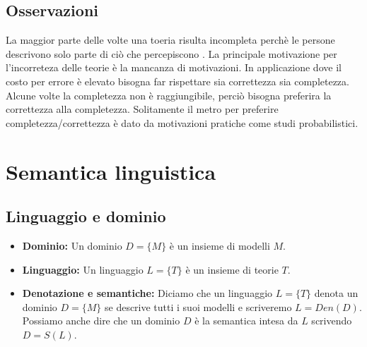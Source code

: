 \documentclass[../main.tex]{subfiles}
\newcommand{\spazio}{\vspace{1em} \newline}
\begin{document}
    \subsection{Osservazioni}
    La maggior parte delle volte una toeria risulta incompleta perchè le persone descrivono solo parte di ciò che percepiscono .
    \spazio
    La principale motivazione per l'incorreteza delle teorie è la mancanza di motivazioni.
    \spazio
    In applicazione dove il costo per errore è elevato bisogna far rispettare sia correttezza sia completezza.
    \space
    Alcune volte la completezza non è raggiungibile, perciò bisogna preferira la correttezza alla completezza.
    \space
    Solitamente il metro per preferire completezza/correttezza è dato da motivazioni pratiche come studi probabilistici.

    \section{Semantica linguistica}
    \subsection{Linguaggio e dominio}
    \begin{itemize}
        \item \textbf{Dominio:} Un dominio $D=\{M\}$ è un insieme di modelli $M$.
        \item \textbf{Linguaggio:} Un linguaggio $L=\{T\}$ è un insieme di teorie $T$.
        \item \textbf{Denotazione e semantiche:}  Diciamo che un linguaggio $L=\{T\}$ denota un dominio $D=\{M\}$ se descrive tutti i suoi modelli e scriveremo $L=Den(D)$.\\
            Possiamo anche dire che un dominio $D$ è la semantica intesa da $L$ scrivendo $D=S(L)$.
    \end{itemize}
\end{document}
